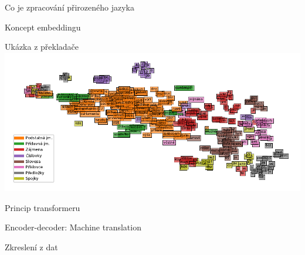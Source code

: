 \documentclass[aspectratio=169,dvipsnames]{beamer}
\begin{document}

\begin{frame}{Co je zpracování přirozeného jazyka}
\end{frame}


\begin{frame}{Koncept embeddingu}
\end{frame}


\begin{frame}{Ukázka z překladače}
    \hspace*{-10pt}\includegraphics{./plots/tsne.pdf}
\end{frame}


\begin{frame}{Princip transformeru}
    
\end{frame}


\begin{frame}{Encoder-decoder: Machine translation}
\end{frame}

\begin{frame}{Zkreslení z dat}
\end{frame}

\end{document}
